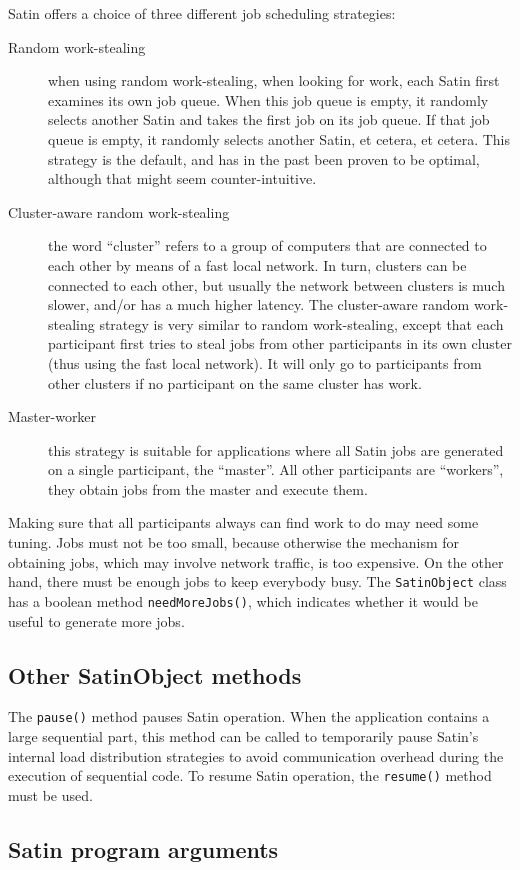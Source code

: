 \documentclass[10pt]{article}
\newcommand{\mysubsection}[1]{\subsection{#1}\label{#1}}
\begin{document}
Satin offers a choice of three different job scheduling strategies:
\begin{description}
\item[Random work-stealing]
when using random work-stealing, when looking for work, each Satin
first examines its own job queue. When this job queue is empty,
it randomly selects another Satin and takes the first job on its job queue.
If that job queue is empty, it randomly selects another Satin, et cetera,
et cetera.  This strategy is the default, and has in the past been proven
to be optimal, although that might seem counter-intuitive.
\item[Cluster-aware random work-stealing]
the word ``cluster'' refers to a group of computers that are connected
to each other by means of a fast local network.
In turn, clusters can be connected to each other, but usually the
network between clusters is much slower, and/or has a much higher latency.
The cluster-aware random work-stealing strategy
is very similar to random work-stealing, except that
each participant first tries to steal jobs from other participants in its
own cluster (thus using the fast local network).
It will only go to participants from other clusters if no participant on the
same cluster has work.
\item[Master-worker]
this strategy is suitable for applications where all Satin jobs are
generated on a single participant, the ``master''. All other participants
are ``workers'', they obtain jobs from the master and execute them.
\end{description}

Making sure that all participants always can find work to do may need
some tuning. Jobs must not be too small, because otherwise the mechanism
for obtaining jobs, which may involve network traffic, is too expensive.
On the other hand, there must be enough jobs to keep everybody busy.
The \verb+SatinObject+ class has a boolean method \verb+needMoreJobs()+,
which indicates whether it would be useful to generate more jobs.

\mysubsection{Other SatinObject methods}

The \verb+pause()+ method pauses Satin operation. When the application
contains a large sequential part, this method can be called to temporarily
pause Satin's internal load distribution strategies to avoid communication
overhead during the execution of sequential code.
To resume Satin operation, the \verb+resume()+ method must be used.

\mysubsection{Satin program arguments}
\end{document}
